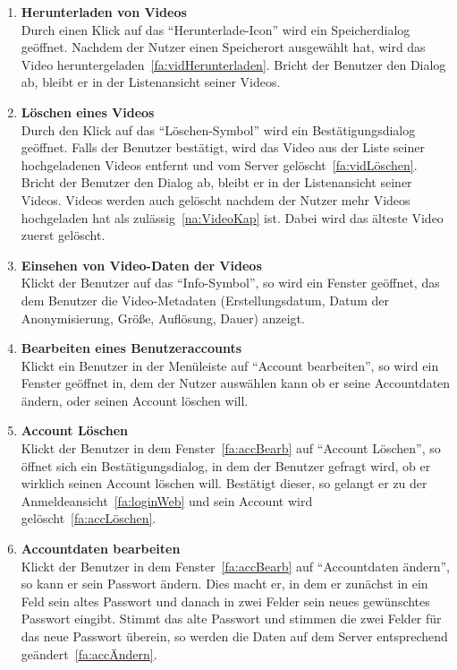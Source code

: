\begin{enumerate}
\item \label{fa:anonymVidherunt}\textbf{Herunterladen von  Videos} \hfill \\
Durch einen Klick auf das ``Herunterlade-Icon'' wird ein Speicherdialog geöffnet. Nachdem der Nutzer einen Speicherort ausgewählt hat, wird das Video heruntergeladen~\eqref{fa:vidHerunterladen}. Bricht der Benutzer den Dialog ab, bleibt er in der Listenansicht seiner Videos.

\item \label{fa:anonymVidlösch}\textbf{Löschen eines  Videos} \hfill \\
Durch den Klick auf das ``Löschen-Symbol'' wird ein Bestätigungsdialog geöffnet. Falls der Benutzer bestätigt, wird das Video aus der Liste seiner hochgeladenen Videos entfernt und vom Server gelöscht~\eqref{fa:vidLöschen}. Bricht der Benutzer den Dialog ab, bleibt er in der Listenansicht seiner Videos. Videos werden auch gelöscht nachdem der Nutzer mehr Videos hochgeladen hat als zulässig~\eqref{na:VideoKap} ist. Dabei wird das älteste Video zuerst gelöscht.

\item \label{fa:anonymViddaten}\textbf{Einsehen von Video-Daten der  Videos} \hfill \\
Klickt der Benutzer auf das ``Info-Symbol'', so wird ein Fenster geöffnet, das dem Benutzer die Video-\gls{Metadaten} (Erstellungsdatum, Datum der Anonymisierung, Größe, Auflösung, Dauer) anzeigt.

\item \label{fa:accBearb}\textbf{Bearbeiten eines Benutzeraccounts} \hfill \\
Klickt ein Benutzer in der Menüleiste auf ``Account bearbeiten'', so wird ein Fenster geöffnet in, dem der Nutzer auswählen kann ob er seine Accountdaten ändern, oder seinen Account löschen will.

\item \label{fa:accLöschenWeb}\textbf{Account Löschen} \hfill \\
Klickt der Benutzer in dem Fenster~\eqref{fa:accBearb} auf ``Account Löschen'', so öffnet sich ein Bestätigungsdialog, in dem der Benutzer gefragt wird, ob er wirklich seinen Account löschen will. Bestätigt dieser, so gelangt er zu der Anmeldeansicht~\eqref{fa:loginWeb} und sein Account wird gelöscht~\eqref{fa:accLöschen}.

\item \label{fa:accDatBearb}\textbf{Accountdaten bearbeiten} \hfill \\
Klickt der Benutzer in dem Fenster~\eqref{fa:accBearb} auf ``Accountdaten ändern'', so kann er sein Passwort ändern. Dies macht er, in dem er zunächst in ein Feld sein altes Passwort und danach in zwei Felder sein neues gewünschtes Passwort eingibt. Stimmt das alte Passwort und stimmen die zwei Felder für das neue Passwort überein, so werden die Daten auf dem Server entsprechend geändert~\eqref{fa:accÄndern}.


\end{enumerate}
